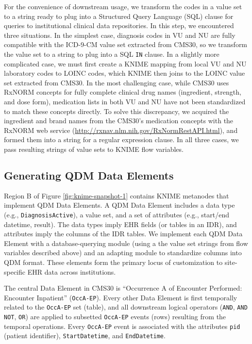 \documentclass{article}
\begin{document}
For the convenience of downstream usage, we transform the codes in a value set to a string ready to plug into a Structured Query Language (SQL) clause for queries to institutional clinical data repositories. In this step, we encountered three situations. In the simplest case, diagnosis codes in VU and NU are fully compatible with the ICD-9-CM value set extracted from CMS30, so we transform the value set to a string to plug into a SQL \texttt{IN} clause. In a slightly more complicated case, we must first create a KNIME mapping from local VU and NU laboratory codes to LOINC codes, which KNIME then joins to the LOINC value set extracted from CMS30. In the most challenging case, while CMS30 uses RxNORM concepts for fully complete clinical drug names (ingredient, strength, and dose form), medication lists in both VU and NU have not been standardized to match these concepts directly. To solve this discrepancy, we acquired the ingredient and brand names from the CMS30's medication concepts with the RxNORM web service (\url{http://rxnav.nlm.nih.gov/RxNormRestAPI.html}), and formed them into a string for a regular expression clause. In all three cases, we pass resulting strings of value sets to KNIME flow variables.

\subsection{Generating QDM Data Elements}

Region B of Figure \ref{fig:knime-snapshot-1} contains KNIME metanodes that implement QDM Data Elements. A QDM Data Element includes a data type (e.g., \texttt{DiagnosisActive}), a value set, and a set of attributes (e.g., start/end datetime, result). The data types imply EHR fields (or tables in an IDR), and attributes imply the columns of the IDR tables. We implement each QDM Data Element with a database-querying module (using a the value set strings from flow variables described above) and an adapting module to standardize columns into QDM format. These elements form the primary locus of customization to site-specific EHR data across institutions.

The central Data Element in CMS30 is ``Occurrence A of Encounter Performed: Encounter Inpatient'' (\texttt{OccA-EP}). Every other Data Element is first temporally related to the \texttt{OccA-EP} set (table), and all downstream logical operators (\texttt{AND}, \texttt{AND NOT}, \texttt{OR}) are applied to subsetted \texttt{OccA-EP} events (rows) resulting from the temporal operations. Every \texttt{OccA-EP} event is associated with the attributes \texttt{pid} (patient identifier), \texttt{StartDatetime}, and \texttt{EndDatetime}. 
\end{document}
